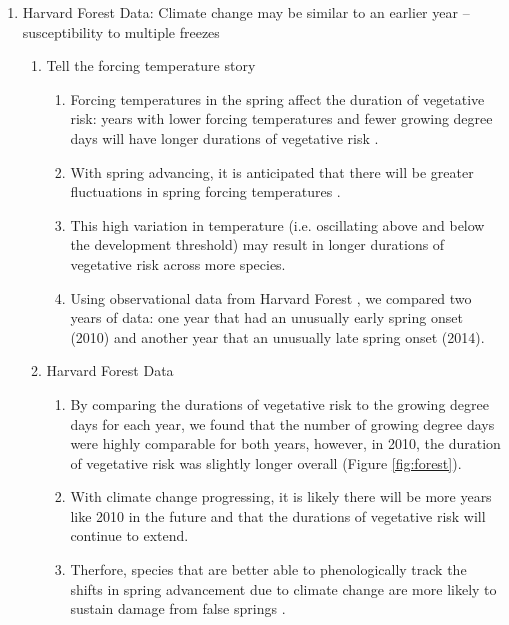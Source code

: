 \documentclass{article}\usepackage[]{graphicx}\usepackage[]{color}
\begin{document}
\begin{enumerate}
\item Harvard Forest Data: Climate change may be similar to an earlier year -- susceptibility to multiple freezes 
\begin{enumerate}
\item Tell the forcing temperature story
\begin{enumerate}
\item Forcing temperatures in the spring affect the duration of vegetative risk: years with lower forcing temperatures and fewer growing degree days will have longer durations of vegetative risk \citep{Donnelly2017}.
\item With spring advancing, it is anticipated that there will be greater fluctuations in spring forcing temperatures \citep{Martin2010}.
\item This high variation in temperature (i.e. oscillating above and below the development threshold) may result in longer durations of vegetative risk across more species.
\item Using observational data from Harvard Forest \citep{Okeefe2014}, we compared two years of data: one year that had an unusually early spring onset (2010) and another year that an unusually late spring onset (2014).
\end{enumerate}
\item Harvard Forest Data
\begin{enumerate}
\item By comparing the durations of vegetative risk to the growing degree days for each year, we found that the number of growing degree days were highly comparable for both years, however, in 2010, the duration of vegetative risk was slightly longer overall (Figure \ref{fig:forest}). 
\item With climate change progressing, it is likely there will be more years like 2010 in the future and that the durations of vegetative risk will continue to extend. %
\item Therfore, species that are better able to phenologically track the shifts in spring advancement due to climate change are more likely to sustain damage from false springs \citep{Scheifinger2003}.
\end{enumerate}
\end{enumerate}



\end{enumerate}
\end{document}
